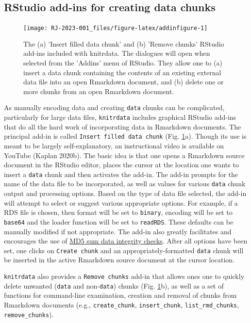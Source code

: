 \hypertarget{addins}{%
\subsection{RStudio add-ins for creating data chunks}\label{addins}}

\begin{figure}
\texttt{[image: RJ-2023-001\_files/figure-latex/addinfigure-1]} \caption{The (a) 'Insert filled data chunk' and (b) 'Remove chunks' RStudio add-ins included with knitrdata. The dialogues will open when selected from the 'Addins' menu of RStudio. They allow one to (a) insert a data chunk containing the contents of an existing external data file into an open Rmarkdown document, and (b) delete one or more chunks from an open Rmarkdown document.}\label{fig:addinfigure}
\end{figure}

As manually encoding data and creating \texttt{data} chunks can be complicated, particularly for large data files, \texttt{knitrdata} includes graphical RStudio add-ins that do all the hard work of incorporating data in Rmarkdown documents. The principal add-in is called \texttt{Insert\ filled\ data\ chunk} (Fig. \ref{fig:addinfigure}a). Though its use is meant to be largely self-explanatory, an instructional video is available on YouTube (Kaplan 2020b). The basic idea is that one opens a Rmarkdown source document in the RStudio editor, places the cursor at the location one wants to insert a \texttt{data} chunk and then activates the add-in. The add-in prompts for the name of the data file to be incorporated, as well as values for various \texttt{data} chunk output and processing options. Based on the type of data file selected, the add-in will attempt to select or suggest various appropriate options. For example, if a RDS file is chosen, then format will be set to \texttt{binary}, encoding will be set to \texttt{base64} and the loader function will be set to \texttt{readRDS}. These defaults can be manually modified if not appropriate. The add-in also greatly facilitates and encourages the use of \protect\hyperlink{integrity}{MD5 sum data integrity checks}. After all options have been set, one clicks on \texttt{Create\ chunk} and an appropriately-formatted \texttt{data} chunk will be inserted in the active Rmarkdown source document at the cursor location.

\texttt{knitrdata} also provides a \texttt{Remove\ chunks} add-in that allows ones one to quickly delete unwanted (\texttt{data} and non-\texttt{data}) chunks (Fig. \ref{fig:addinfigure}b), as well as a set of functions for command-line examination, creation and removal of chunks from Rmarkdown documents (e.g., \texttt{create\_chunk}, \texttt{insert\_chunk}, \texttt{list\_rmd\_chunks}, \texttt{remove\_chunks}).

